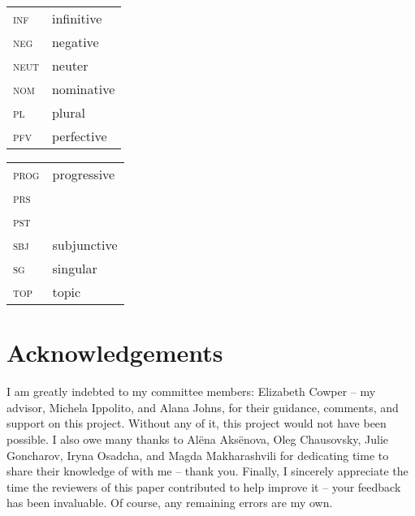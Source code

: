\documentclass[output=paper,modfonts,newtxmath,hidelinks,]{langscibook}
\begin{document}
\begin{tabularx}{.5\textwidth}{@{}lQ@{}}
\textsc{inf}&{infinitive}\\
\textsc{neg}&negative\\
\textsc{neut}&{neuter}\\
\textsc{nom}&{nominative}\\
\textsc{pl}&{plural}\\
\textsc{pfv}&{perfective}\\
\end{tabularx}%
\begin{tabularx}{.5\textwidth}{@{}lQ@{}}
\textsc{prog}&progressive\\
\textsc{prs}&\\
\textsc{pst}&\\
\textsc{sbj}&{subjunctive}\\
\textsc{sg}&singular\\
\textsc{top}&topic\\ 
\end{tabularx}

\section*{Acknowledgements}
I am greatly indebted to my committee members: Elizabeth Cowper -- my advisor, Michela Ippolito, and Alana Johns, for their guidance, comments, and support on this project. Without any of it, this project would not have been possible. I also owe many thanks to Alëna Aksënova, Oleg Chausovsky, Julie Goncharov, Iryna Osadcha, and Magda Makharashvili for dedicating time to share their knowledge of  with me -- thank you. Finally, I sincerely appreciate the time the reviewers of this paper contributed to help improve it -- your feedback has been invaluable. Of course, any remaining errors are my own.


\sloppy
\printbibliography[heading=subbibliography,notkeyword=this]
\end{document}
